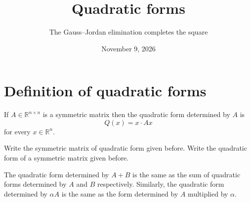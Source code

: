 
\title{Quadratic forms}
\subtitle{The Gauss--Jordan elimination completes the square}
\date[Linear Algebra Fall week 8]{November 9, 2026}

\section{Definition of quadratic forms}
\begin{frame}
    \begin{theorem}
        If $A\in\mathbb{R}^{n\times n}$ is a symmetric matrix then the quadratic form determined by 
        $A$ is
        \[
            Q(x)=x\cdot Ax
        \]
        for every $x\in\mathbb{R}^n.$
    \end{theorem}
    \begin{example}
        Write the symmetric matrix of quadratic form given before.
        Write the quadratic form of a symmetric matrix given before.
    \end{example}
    \begin{theorem}
        The quadratic form determined by $A+B$ is the same as the sum of quadratic forms determined by $A$ and $B$ respectively.
        Similarly,
        the quadratic form determined by $\alpha A$ is the same as the form determined by $A$ multiplied by $\alpha$.
    \end{theorem}
\end{frame}
